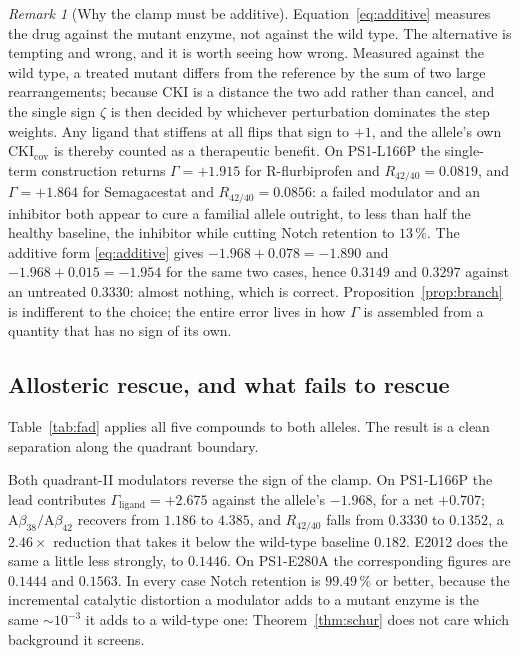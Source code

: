 \documentclass[11pt,reqno]{amsart}
\theoremstyle{plain}
\theoremstyle{definition}
\theoremstyle{remark}
\newtheorem{remark}[theorem]{Remark}
\numberwithin{equation}{section}
\newcommand{\CKI}{\mathrm{CKI}}
\newcommand{\CKIcov}{\CKI_{\mathrm{cov}}}
\newcommand{\Ab}{\mathrm{A}\beta}
\begin{document}
\begin{remark}[Why the clamp must be additive]
\label{rem:additive}
Equation~\eqref{eq:additive} measures the drug against the mutant enzyme, not against the wild type. The alternative is tempting and wrong, and it is worth seeing how wrong. Measured against the wild type, a treated mutant differs from the reference by the sum of two large rearrangements; because $\CKI$ is a distance the two add rather than cancel, and the single sign $\zeta$ is then decided by whichever perturbation dominates the step weights. Any ligand that stiffens at all flips that sign to $+1$, and the allele's own $\CKIcov$ is thereby counted as a therapeutic benefit. On PS1-L166P the single-term construction returns $\Gamma=+1.915$ for R-flurbiprofen and $R_{42/40}=0.0819$, and $\Gamma=+1.864$ for Semagacestat and $R_{42/40}=0.0856$: a failed modulator and an inhibitor both appear to cure a familial allele outright, to less than half the healthy baseline, the inhibitor while cutting Notch retention to $13\,\%$. The additive form \eqref{eq:additive} gives $-1.968+0.078=-1.890$ and $-1.968+0.015=-1.954$ for the same two cases, hence $0.3149$ and $0.3297$ against an untreated $0.3330$: almost nothing, which is correct. Proposition~\ref{prop:branch} is indifferent to the choice; the entire error lives in how $\Gamma$ is assembled from a quantity that has no sign of its own.
\end{remark}

\subsection{Allosteric rescue, and what fails to rescue}
Table~\ref{tab:fad} applies all five compounds to both alleles. The result is a clean separation along the quadrant boundary.

Both quadrant-II modulators reverse the sign of the clamp. On PS1-L166P the lead contributes $\Gamma_{\mathrm{ligand}}=+2.675$ against the allele's $-1.968$, for a net $+0.707$; $\Ab_{38}/\Ab_{42}$ recovers from $1.186$ to $4.385$, and $R_{42/40}$ falls from $0.3330$ to $0.1352$, a $2.46\times$ reduction that takes it below the wild-type baseline $0.182$. E2012 does the same a little less strongly, to $0.1446$. On PS1-E280A the corresponding figures are $0.1444$ and $0.1563$. In every case Notch retention is $99.49\,\%$ or better, because the incremental catalytic distortion a modulator adds to a mutant enzyme is the same $\sim10^{-3}$ it adds to a wild-type one: Theorem~\ref{thm:schur} does not care which background it screens.
\end{document}
